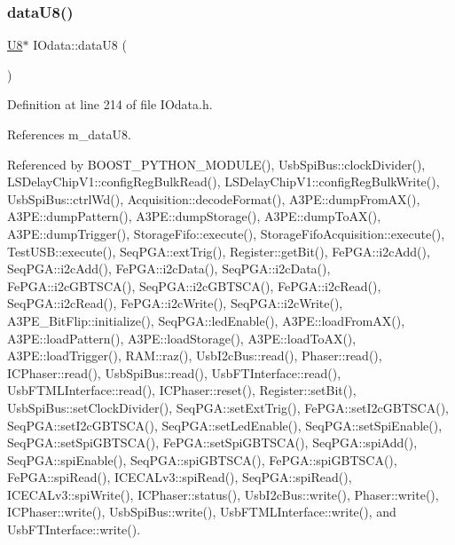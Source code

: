 \subsubsection{\texorpdfstring{data\+U8()}{dataU8()}\hspace{0.1cm}{\footnotesize\ttfamily [1/2]}}
{\footnotesize\ttfamily \hyperlink{classIOdata_a18d1354b7cdaf0f8a8001fdbb3ced418}{U8}$\ast$ I\+Odata\+::data\+U8 (\begin{DoxyParamCaption}{ }\end{DoxyParamCaption})\hspace{0.3cm}{\ttfamily [inline]}}



Definition at line 214 of file I\+Odata.\+h.



References m\+\_\+data\+U8.



Referenced by B\+O\+O\+S\+T\+\_\+\+P\+Y\+T\+H\+O\+N\+\_\+\+M\+O\+D\+U\+L\+E(), Usb\+Spi\+Bus\+::clock\+Divider(), L\+S\+Delay\+Chip\+V1\+::config\+Reg\+Bulk\+Read(), L\+S\+Delay\+Chip\+V1\+::config\+Reg\+Bulk\+Write(), Usb\+Spi\+Bus\+::ctrl\+Wd(), Acquisition\+::decode\+Format(), A3\+P\+E\+::dump\+From\+A\+X(), A3\+P\+E\+::dump\+Pattern(), A3\+P\+E\+::dump\+Storage(), A3\+P\+E\+::dump\+To\+A\+X(), A3\+P\+E\+::dump\+Trigger(), Storage\+Fifo\+::execute(), Storage\+Fifo\+Acquisition\+::execute(), Test\+U\+S\+B\+::execute(), Seq\+P\+G\+A\+::ext\+Trig(), Register\+::get\+Bit(), Fe\+P\+G\+A\+::i2c\+Add(), Seq\+P\+G\+A\+::i2c\+Add(), Fe\+P\+G\+A\+::i2c\+Data(), Seq\+P\+G\+A\+::i2c\+Data(), Fe\+P\+G\+A\+::i2c\+G\+B\+T\+S\+C\+A(), Seq\+P\+G\+A\+::i2c\+G\+B\+T\+S\+C\+A(), Fe\+P\+G\+A\+::i2c\+Read(), Seq\+P\+G\+A\+::i2c\+Read(), Fe\+P\+G\+A\+::i2c\+Write(), Seq\+P\+G\+A\+::i2c\+Write(), A3\+P\+E\+\_\+\+Bit\+Flip\+::initialize(), Seq\+P\+G\+A\+::led\+Enable(), A3\+P\+E\+::load\+From\+A\+X(), A3\+P\+E\+::load\+Pattern(), A3\+P\+E\+::load\+Storage(), A3\+P\+E\+::load\+To\+A\+X(), A3\+P\+E\+::load\+Trigger(), R\+A\+M\+::raz(), Usb\+I2c\+Bus\+::read(), Phaser\+::read(), I\+C\+Phaser\+::read(), Usb\+Spi\+Bus\+::read(), Usb\+F\+T\+Interface\+::read(), Usb\+F\+T\+M\+L\+Interface\+::read(), I\+C\+Phaser\+::reset(), Register\+::set\+Bit(), Usb\+Spi\+Bus\+::set\+Clock\+Divider(), Seq\+P\+G\+A\+::set\+Ext\+Trig(), Fe\+P\+G\+A\+::set\+I2c\+G\+B\+T\+S\+C\+A(), Seq\+P\+G\+A\+::set\+I2c\+G\+B\+T\+S\+C\+A(), Seq\+P\+G\+A\+::set\+Led\+Enable(), Seq\+P\+G\+A\+::set\+Spi\+Enable(), Seq\+P\+G\+A\+::set\+Spi\+G\+B\+T\+S\+C\+A(), Fe\+P\+G\+A\+::set\+Spi\+G\+B\+T\+S\+C\+A(), Seq\+P\+G\+A\+::spi\+Add(), Seq\+P\+G\+A\+::spi\+Enable(), Seq\+P\+G\+A\+::spi\+G\+B\+T\+S\+C\+A(), Fe\+P\+G\+A\+::spi\+G\+B\+T\+S\+C\+A(), Fe\+P\+G\+A\+::spi\+Read(), I\+C\+E\+C\+A\+Lv3\+::spi\+Read(), Seq\+P\+G\+A\+::spi\+Read(), I\+C\+E\+C\+A\+Lv3\+::spi\+Write(), I\+C\+Phaser\+::status(), Usb\+I2c\+Bus\+::write(), Phaser\+::write(), I\+C\+Phaser\+::write(), Usb\+Spi\+Bus\+::write(), Usb\+F\+T\+M\+L\+Interface\+::write(), and Usb\+F\+T\+Interface\+::write().


